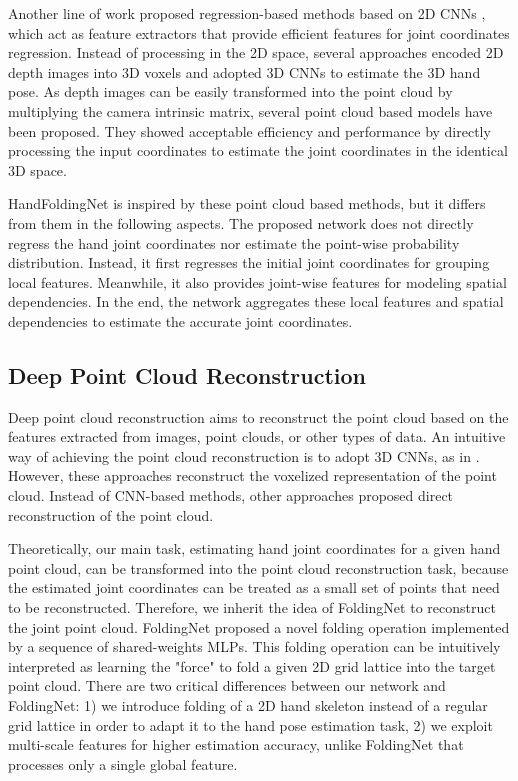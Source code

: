 \documentclass[10pt,twocolumn,letterpaper]{article}
\begin{document}
Another line of work proposed regression-based methods based on 2D CNNs \cite{guo2017region, ren2019srn, chen2020pose}, which act as feature extractors that provide efficient features for joint coordinates regression. Instead of processing in the 2D space, several approaches \cite{ge20173d, moon2018v2v} encoded 2D depth images into 3D voxels and adopted 3D CNNs to estimate the 3D hand pose. As depth images can be easily transformed into the point cloud by multiplying the camera intrinsic matrix, several point cloud based models \cite{ge2018hand, ge2018point, chen2018shpr, li2019point} have been proposed. They showed acceptable efficiency and performance by directly processing the input coordinates to estimate the joint coordinates in the identical 3D space.


HandFoldingNet is inspired by these point cloud based methods, but it differs from them in the following aspects. The proposed network does not directly regress the hand joint coordinates nor estimate the point-wise probability distribution. Instead, it first regresses the initial joint coordinates for grouping local features. Meanwhile, it also provides joint-wise features for modeling spatial dependencies. In the end, the network aggregates these local features and spatial dependencies to estimate the accurate joint coordinates. 

\subsection{Deep Point Cloud Reconstruction}

Deep point cloud reconstruction aims to reconstruct the point cloud based on the features extracted from images, point clouds, or other types of data. An intuitive way of achieving the point cloud reconstruction is to adopt 3D CNNs, as in \cite{wu20153d, brock2016generative, girdhar2016learning, sharma2016vconv}. However, these approaches reconstruct the voxelized representation of the point cloud. Instead of CNN-based methods, 
other approaches \cite{achlioptas2018learning, yang2018foldingnet, wang20193dn, cheng2019point} proposed direct reconstruction of the point cloud. 


Theoretically, our main task, estimating hand joint coordinates for a given hand point cloud, can be transformed into the point cloud reconstruction task, because the estimated joint coordinates can be treated as a small set of points that need to be reconstructed. Therefore, we inherit the idea of FoldingNet \cite{yang2018foldingnet} to reconstruct the joint point cloud. FoldingNet proposed a novel folding operation implemented by a sequence of shared-weights MLPs. This folding operation can be intuitively interpreted as learning the "force" to fold a given 2D grid lattice into the target point cloud. There are two critical differences between our network and FoldingNet: 1) we introduce folding of a 2D hand skeleton instead of a regular grid lattice in order to adapt it to the hand pose estimation task, 2) we exploit multi-scale features for higher estimation accuracy, unlike FoldingNet that processes only a single global feature.
\end{document}
